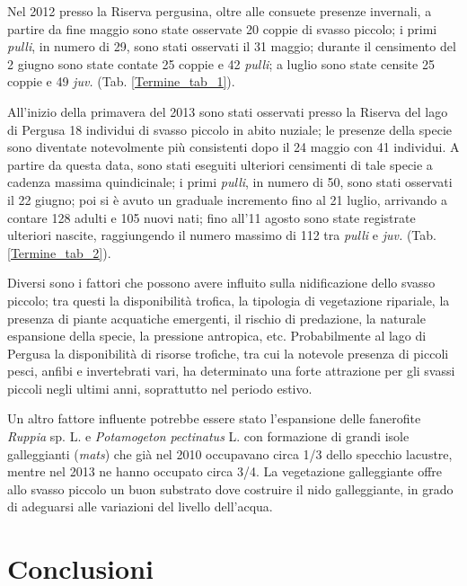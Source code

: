Nel 2012 presso la Riserva pergusina, oltre alle consuete presenze
invernali, a partire da fine maggio sono state osservate 20 coppie di
svasso piccolo; i primi \textit{pulli}, in numero di 29, sono stati
osservati il 31 maggio; durante il censimento del 2 giugno sono state
contate 25 coppie e 42 \textit{pulli}; a luglio sono state censite 25
coppie e 49 \textit{juv.} (Tab. \ref{Termine_tab_1}).

All{\textquoteright}inizio della primavera del 2013 sono stati osservati
presso la Riserva del lago di Pergusa 18 individui di svasso piccolo in
abito nuziale; le presenze della specie sono diventate notevolmente
pi\`u consistenti dopo il 24 maggio con 41 individui. A partire da
questa data, sono stati eseguiti ulteriori censimenti di tale specie a
cadenza massima quindicinale; i primi \textit{pulli}, in numero di 50,
sono stati osservati il 22 giugno; poi si \`e avuto un graduale
incremento fino al 21 luglio, arrivando a contare 128 adulti e 105
nuovi nati; fino all{\textquoteright}11 agosto sono state registrate
ulteriori nascite, raggiungendo il numero massimo di 112 tra
\textit{pulli} e \textit{juv.} (Tab. \ref{Termine_tab_2}).

Diversi sono i fattori che possono avere influito sulla nidificazione
dello svasso piccolo; tra questi la disponibilit\`a trofica, la
tipologia di vegetazione ripariale, la presenza di piante acquatiche
{emergenti, il rischio di predazione, la naturale
espansione della specie, la pressione antropica, etc. Probabilmente} al
lago di Pergusa la disponibilit\`a di risorse trofiche, tra cui la
notevole presenza di piccoli pesci, anfibi e invertebrati vari, ha
determinato una forte attrazione per gli svassi piccoli negli ultimi
anni, soprattutto nel periodo estivo.

Un altro fattore influente potrebbe essere stato
l{\textquoteright}espansione delle fanerofite \textit{Ruppia} sp. L. e
\textit{Potamogeton} \textit{pectinatus} L. con formazione di grandi
isole galleggianti (\textit{mats}) che gi\`a nel 2010 occupavano circa
1/3 dello specchio lacustre, mentre nel 2013 ne hanno occupato circa
3/4. La vegetazione galleggiante offre allo svasso piccolo un buon
substrato dove costruire il nido galleggiante, in grado di adeguarsi
alle variazioni del livello dell{\textquoteright}acqua.

\section*{Conclusioni}

